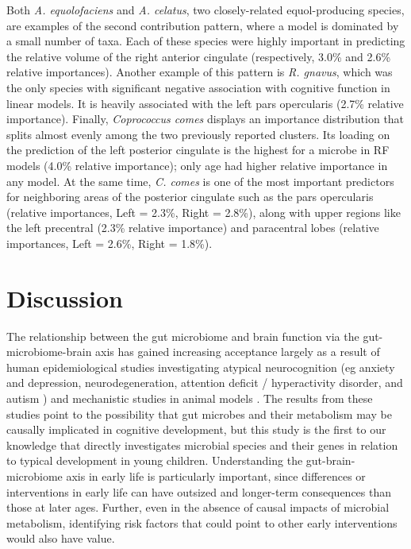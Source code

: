 \documentclass{article}
\begin{document}
Both \emph{A. equolofaciens} and \emph{A. celatus}, two closely-related
equol-producing species, are examples of the second contribution
pattern, where a model is dominated by a small number of taxa.
Each of these species were highly important in predicting the relative volume of
the right anterior cingulate (respectively, 3.0\% and 2.6\% relative
importances). Another example of this pattern is \emph{R. gnavus}, which was the only
species with significant negative association with cognitive function in linear models.
It is heavily associated with the left pars opercularis (2.7\% relative importance). 
Finally, \emph{Coprococcus comes} displays an importance
distribution that splits almost evenly among the two previously reported
clusters. Its loading on the prediction of the left posterior cingulate
is the highest for a microbe in RF models (4.0\% relative importance);
only age had higher relative importance in any model. At the same time,
\textit{C. comes} is one of the most important predictors for neighboring areas of the
posterior cingulate such as the pars opercularis (relative importances,
Left = 2.3\%, Right = 2.8\%), along with upper regions like the left
precentral (2.3\% relative importance) and paracentral lobes (relative
importances, Left = 2.6\%, Right = 1.8\%).

\section*{Discussion}

The relationship between the gut microbiome and brain function via the
gut-microbiome-brain axis has gained increasing acceptance largely as a
result of human epidemiological studies investigating atypical
neurocognition (eg anxiety and depression, neurodegeneration, attention
deficit / hyperactivity disorder, and autism \cite{romanGutBrainAxis2018,fosterGutBrainAxis2013})
and mechanistic studies in animal models
\cite{hsiaoMicrobiotaModulateBehavioral2013,needhamGutderivedMetaboliteAlters2022}.
The results from these studies point to the possibility
that gut microbes and their metabolism may be causally implicated in
cognitive development, but this study is the first to our knowledge that
directly investigates microbial species and their genes in relation to
typical development in young children. Understanding the gut-brain-microbiome axis
in early life is particularly important, since differences or
interventions in early life can have outsized and longer-term
consequences than those at later ages. Further, even in the absence of
causal impacts of microbial metabolism, identifying risk factors that
could point to other early interventions would also have value.
\end{document}
